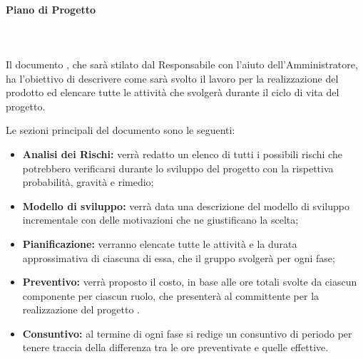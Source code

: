 \paragraph{Piano di Progetto}\mbox{}
\\\\Il documento \PdP, che sarà stilato dal Responsabile con l'aiuto dell'Amministratore, ha l'obiettivo di descrivere come sarà svolto il lavoro per la realizzazione del prodotto ed elencare tutte le attività che \Gruppo{} svolgerà durante il ciclo di vita del progetto.


Le sezioni principali del documento sono le seguenti:
\begin{itemize}
	\item \textbf{Analisi dei Rischi:} verrà redatto un elenco di tutti i possibili rischi che potrebbero verificarsi durante lo sviluppo del progetto con la rispettiva probabilità, gravità e rimedio;
	\item \textbf{Modello di sviluppo:} verrà data una descrizione del modello di sviluppo incrementale con delle motivazioni che ne giustificano la scelta;
	\item \textbf{Pianificazione:} verranno elencate tutte le attività e la durata approssimativa di ciascuna di essa, che il gruppo svolgerà per ogni fase;
	\item \textbf{Preventivo:} verrà proposto il costo, in base alle ore totali svolte da ciascun componente per ciascun ruolo, che \Gruppo{} presenterà al committente per la realizzazione del progetto \NomeProgetto{}.
	\item \textbf{Consuntivo:} al termine di ogni fase si redige un consuntivo di periodo per tenere traccia della differenza tra le ore preventivate e quelle effettive.
\end{itemize}